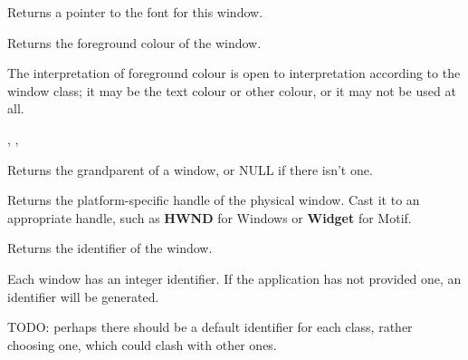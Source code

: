 Returns a pointer to the font for this window.



\label{wxwindowgetforegroundcolour}


Returns the foreground colour of the window.


The interpretation of foreground colour is open to interpretation according
to the window class; it may be the text colour or other colour, or it may not
be used at all.


,\rtfsp
{},\rtfsp
{}



Returns the grandparent of a window, or NULL if there isn't one.



Returns the platform-specific handle of the physical window. Cast it to an appropriate
handle, such as {\bf HWND} for Windows or {\bf Widget} for Motif.

\label{wxwindowgetid}


Returns the identifier of the window.


Each window has an integer identifier. If the application has not provided one,
an identifier will be generated.

TODO: perhaps there should be a default identifier for each class, rather
choosing one, which could clash with other ones.




